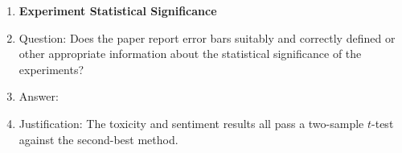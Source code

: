 \begin{enumerate}
\item {\bf Experiment Statistical Significance}
    \item[] Question: Does the paper report error bars suitably and correctly defined or other appropriate information about the statistical significance of the experiments?
    \item[] Answer: \answerYes{} %
    \item[] Justification: The toxicity and sentiment results all pass a two-sample $t$-test against the second-best method.


\end{enumerate}
